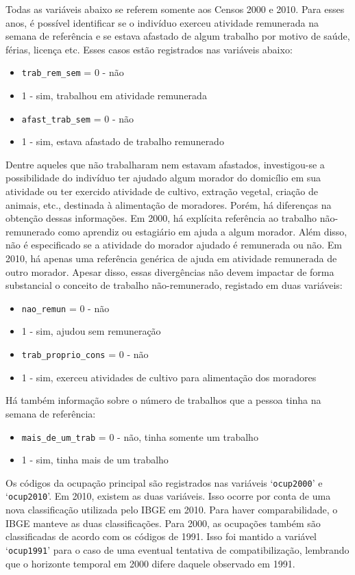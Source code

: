 \documentclass[12pt,a4paper]{article}
\newcommand{\vr}[1]{\texttt{#1}}
\begin{document}
Todas as variáveis abaixo se referem somente aos Censos 2000 e 2010. Para esses anos, é possível identificar se o indivíduo exerceu atividade remunerada na semana de referência e se estava afastado de algum trabalho por motivo de saúde, férias, licença etc. Esses casos estão registrados nas variáveis abaixo:
\begin{itemize}
  \item \vr{trab\_rem\_sem} = 0 - não
  \item 1 - sim, trabalhou em atividade remunerada
  \item \vr{afast\_trab\_sem} = 0 - não
  \item 1 - sim, estava afastado de trabalho remunerado
\end{itemize}

Dentre aqueles que não trabalharam nem estavam afastados, investigou-se a possibilidade do indivíduo ter ajudado algum morador do domicílio em sua atividade ou ter exercido atividade de cultivo, extração vegetal, criação de animais, etc., destinada à alimentação de moradores. Porém, há diferenças na obtenção dessas informações. Em 2000, há explícita referência ao trabalho não-remunerado como aprendiz ou estagiário em ajuda a algum morador. Além disso, não é especificado se a atividade do morador ajudado é remunerada ou não. Em 2010, há apenas uma referência genérica de ajuda em atividade remunerada de outro morador. Apesar disso, essas divergências não devem impactar de forma substancial o conceito de trabalho não-remunerado, registado em duas variáveis:
\begin{itemize}
  \item \vr{nao\_remun} = 0 - não
  \item 1 - sim, ajudou sem remuneração
  \item \vr{trab\_proprio\_cons} = 0 - não
  \item 1 - sim, exerceu atividades de cultivo para alimentação dos moradores
\end{itemize}

Há também informação sobre o número de trabalhos que a pessoa tinha na semana de referência:
\begin{itemize}
  \item \vr{mais\_de\_um\_trab} = 0 - não, tinha somente um trabalho
  \item 1 - sim, tinha mais de um trabalho
\end{itemize}

Os códigos da ocupação principal são registrados nas variáveis ‘\vr{ocup2000}’ e ‘\vr{ocup2010}’. Em 2010, existem as duas variáveis. Isso ocorre por conta de uma nova classificação utilizada pelo IBGE em 2010. Para haver comparabilidade, o IBGE manteve as duas classificações. Para 2000, as ocupações também são classificadas de acordo com os códigos de 1991. Isso foi mantido a variável ‘\vr{ocup1991}’ para o caso de uma eventual tentativa de compatibilização, lembrando que o horizonte temporal em 2000 difere daquele observado em 1991.
\end{document}
